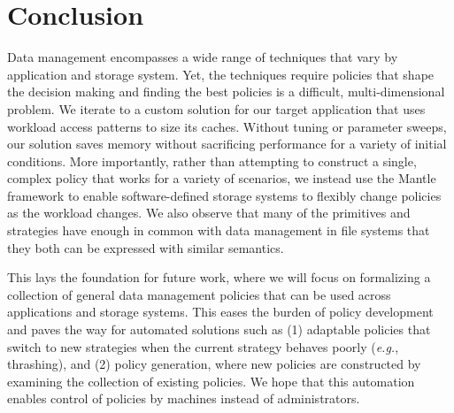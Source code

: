 \section{Conclusion}

Data management encompasses a wide range of techniques that vary by application
and storage system.  Yet, the techniques require policies that shape the
decision making and finding the best policies is a difficult, multi-dimensional
problem.  We iterate to a custom solution for our target application that uses
workload access patterns to size its caches. Without tuning or parameter
sweeps, our solution saves memory without sacrificing performance for a variety
of initial conditions. More importantly, rather than attempting to
construct a single, complex policy that works for a variety of scenarios, we
instead use the Mantle framework to enable software-defined storage systems to
flexibly change policies as the workload changes.  We also observe that many of
the primitives and strategies have enough in common with data management in
file systems that they both can be expressed with similar semantics.

This lays the foundation for future work, where we will focus on formalizing a
collection of general data management policies that can be used across
applications and storage systems.  This eases the
burden of policy development and paves the way for automated solutions such as
(1) adaptable policies that switch to new strategies when the current strategy
behaves poorly ({\it e.g.}, thrashing), and (2)
policy generation, where new policies are constructed by examining the
collection of existing policies.  We hope that this automation
enables control of policies by machines instead of administrators. 
